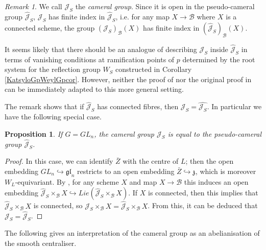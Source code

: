 \documentclass{amsart}
\newtheorem{proposition}[theorem]{Proposition}
\theoremstyle{remark}
\newtheorem{remark}[theorem]{Remark}
\numberwithin{theorem}{section}
\numberwithin{equation}{section}
\begin{document}
\begin{remark}\label{SmallCameralgprmk}
    We call $\mathcal J_S$ the \emph{cameral group}. Since it is open in the pseudo-cameral group $\hat{\mathcal J}_S$, $\mathcal J_S$ has finite index in $\hat{\mathcal J}_S$, i.e. for any map $X \rightarrow \mathcal B$ where $X$ is a connected scheme, the group $(\mathcal J_S)_{\mathcal B}(X)$ has finite index in $(\hat{\mathcal J}_S)_{\mathcal B}(X)$.
    
    It seems likely that there should be an analogue of \cite[Proposition 2.4.7]{Ngo2} describing $\mathcal J_S$ inside $\hat{\mathcal J}_S$ in terms of vanishing conditions at ramification points of $p$ determined by the root system for the reflection group $W_S$ constructed in Corollary \ref{KatsyloGpWeylGpcor}. However, neither the proof of \cite[Proposition 2.4.7]{Ngo2} nor the original proof in \cite[Proposition 12.6]{DG} can be immediately adapted to this more general setting.
\end{remark}

The remark shows that if $\hat{\mathcal J}_S$ has connected fibres, then $\mathcal J_S = \hat{\mathcal J_S}$. In particular we have the following special case.

\begin{proposition}\label{GLnCameralgp}
    If $G=GL_n$, the cameral group $\mathcal J_S$ is equal to the pseudo-cameral group $\hat{\mathcal J}_S$.
\end{proposition}

\begin{proof}
In this case, we can identify $\bar{Z}$ with the centre of $L$; then the open embedding $GL_n \hookrightarrow \mathfrak{gl}_n$ restricts to an open embedding $\bar{Z} \hookrightarrow \mathfrak{z}$, which is moreover $W_L$-equivariant. By \cite[Section 7.6, Proposition 2]{BLR}, for any scheme $X$ and map $X \rightarrow \mathcal B$ this induces an open embedding $\hat{\mathcal J}_S\times _{\mathcal B} X \hookrightarrow Lie(\hat{\mathcal J}_S\times_{\mathcal B}X)$. If $X$ is connected, then this implies that $\hat{\mathcal J}_S\times_{\mathcal B}X$ is connected, so $\mathcal J_S \times_{\mathcal B} X = \hat{\mathcal J}_S \times_{\mathcal B} X$. From this, it can be deduced that $\mathcal J_S = \hat{\mathcal J}_S$.
\end{proof}

The following gives an interpretation of the cameral group as an abelianisation of the smooth centraliser.
\end{document}
